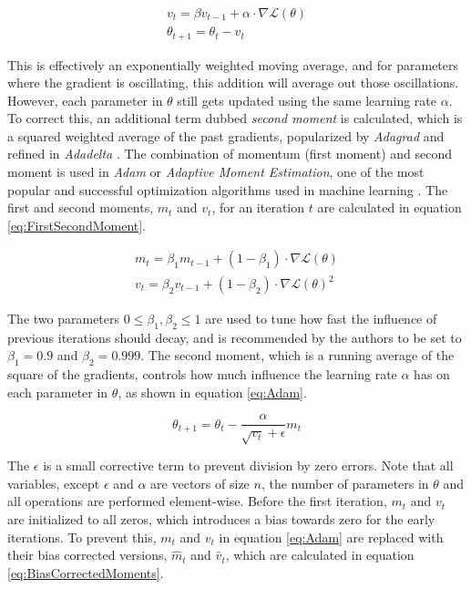 \begin{equation}
    \begin{aligned}
    v_t = \beta v_{t-1} + \alpha \cdot \nabla \mathcal{L}(\theta) \\
    \theta_{t+1} = \theta_t - v_t
    \end{aligned}
\end{equation}

This is effectively an exponentially weighted moving average, and for parameters where the gradient is oscillating, this addition will average out those oscillations. However, each parameter in $\theta$ still gets updated using the same learning rate $\alpha$. To correct this, an additional term dubbed \textit{second moment} is calculated, which is a squared weighted average of the past gradients, popularized by \textit{Adagrad} \cite{duchi_2011_adaptive} and refined in \textit{Adadelta} \cite{zeiler_2012_adadelta}. The combination of momentum (first moment) and second moment is used in \textit{Adam} or \textit{Adaptive Moment Estimation}, one of the most popular and successful optimization algorithms used in machine learning \cite{kingma_2014_adam}. The first and second moments, $m_t$ and $v_t$, for an iteration $t$ are calculated in equation \ref{eq:FirstSecondMoment}.

\begin{equation}\label{eq:FirstSecondMoment}
    \begin{aligned}
    m_t = \beta_1 m_{t-1} + (1-\beta_1) \cdot \nabla \mathcal{L}(\theta) \\
    v_t = \beta_2 v_{t-1} + (1 - \beta_2) \cdot \nabla \mathcal{L}(\theta)^2
    \end{aligned}
\end{equation}

The two parameters $0 \leq \beta_1, \beta_2 \leq 1$ are used to tune how fast the influence of previous iterations should decay, and is recommended by the authors to be set to $\beta_1 = 0.9$ and $\beta_2 = 0.999$. The second moment, which is a running average of the square of the gradients, controls how much influence the learning rate $\alpha$ has on each parameter in $\theta$, as shown in equation \ref{eq:Adam}.

\begin{equation}\label{eq:Adam}
    \theta_{t+1} = \theta_t - \frac{\alpha}{\sqrt{v_t} + \epsilon}m_t
\end{equation}

The $\epsilon$ is a small corrective term to prevent division by zero errors. Note that all variables, except $\epsilon$ and $\alpha$ are vectors of size $n$, the number of parameters in $\theta$ and all operations are performed element-wise. Before the first iteration, $m_t$ and $v_t$ are initialized to all zeros, which introduces a bias towards zero for the early iterations. To prevent this, $m_t$ and $v_t$ in equation \ref{eq:Adam} are replaced with their bias corrected versions, $\hat{m}_t$ and $\hat{v}_t$, which are calculated in equation \ref{eq:BiasCorrectedMoments}.

